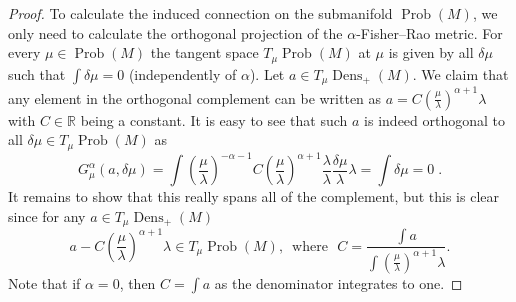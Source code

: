 \documentclass[11pt,reqno]{amsart}
\theoremstyle{definition}
\newcommand{\dx}{\lambda}
\newcommand{\Prob}{\operatorname{Prob}(M)}
\newcommand{\Dens}{\operatorname{Dens}_+(M)}
\begin{document}
\begin{proof}
To calculate the induced connection on the submanifold $\Prob$, we only need to calculate the orthogonal projection of the $\alpha$-Fisher--Rao metric. 
For every $\mu\in \Prob$ the tangent space $T_{\mu}\Prob$ at $\mu$  is given by all $\delta \mu$ such that $\int \delta \mu=0$ (independently of $\alpha$). 
Let $a\in T_{\mu}\Dens$. We claim that  any element in the orthogonal complement can be written as $a=C\left(\frac{\mu}{\dx}\right)^{\alpha+1}\dx$ with $C\in \mathbb R$ being a constant. It is easy to see that such $a$ is indeed orthogonal to all $\delta \mu \in T_{\mu}\Prob$ as 
\begin{equation*}
G^{\alpha}_{\mu}(a,\delta \mu)=\int \left(\frac{\mu}{\dx}\right)^{-\alpha-1}  
C\left(\frac{\mu}{\dx}\right)^{\alpha+1} \frac{\dx}{\dx}\frac{\delta \mu}{\dx}\dx=\int \delta \mu=0\;.
\end{equation*}
It remains to show that this really spans all of the complement, but this is clear since for any $a\in T_{\mu}\Dens$
\begin{equation*}
a-C\left(\frac{\mu}{\dx}\right)^{\alpha+1}\dx \in T_{\mu}\Prob,
\,\text{ where }\,\, C=\frac{\int a}{\int \left(\frac{\mu}{\dx}\right)^{\alpha+1}\dx}.
\end{equation*}
Note that if $\alpha=0$, then $C=\int a$ as the denominator integrates to one.
\end{proof}
\end{document}
